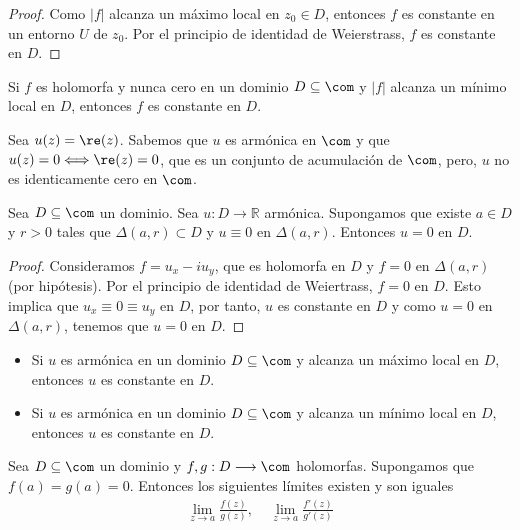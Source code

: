 \begin{proof}
Como $|f|$ alcanza un máximo local en $z_0 \in D$, entonces $f$ es constante en un entorno $U$ de $z_0$. Por el principio de identidad de Weierstrass, $f$ es constante en $D$.
\end{proof}

\begin{teo}
Si $f$ es holomorfa y nunca cero en un dominio $D \subseteq \com$ y $|f|$ alcanza un mínimo local en $D$, entonces $f$ es constante en $D$.
\end{teo}

\begin{ejemplo}
Sea $u(z) = \re(z)$. Sabemos que $u$ es armónica en $\com$ y que $u(z) = 0 \Longleftrightarrow \re(z) = 0$, que es un conjunto de acumulación de $\com$, pero, $u$ no es identicamente cero en $\com$.
\end{ejemplo}

\begin{teo}
Sea $D \subseteq \com$ un dominio. Sea $u: D \longrightarrow \mathbb{R}$ armónica. Supongamos que existe $a \in D$ y $r > 0$ tales que $\Delta(a,r) \subset D$ y $u \equiv 0$ en $\Delta(a,r)$. Entonces $u = 0$ en $D$.
\end{teo}

\begin{proof}
Consideramos $f = u_x - iu_y$, que es holomorfa en $D$ y $f = 0$ en $\Delta(a,r)$ (por hipótesis). Por el principio de identidad de Weiertrass, $f = 0$ en $D$. Esto implica que $u_x \equiv 0 \equiv u_y$ en $D$, por tanto, $u$ es constante en $D$ y como $u = 0$ en $\Delta(a,r)$, tenemos que $u = 0$ en $D$.
\end{proof}

\begin{teo}
\begin{itemize}
    \item Si $u$ es armónica en un dominio $D \subseteq \com$ y alcanza un máximo local en $D$, entonces $u$ es constante en $D$.
    \item Si $u$ es armónica en un dominio $D \subseteq \com$ y alcanza un mínimo local en $D$, entonces $u$ es constante en $D$.
\end{itemize}
\end{teo}

\begin{teo}
Sea $D \subseteq \com$ un dominio y $f,g: D \longrightarrow \com$ holomorfas. Supongamos que $f(a) = g(a) = 0$. Entonces los siguientes límites existen y son iguales
\begin{align*}
    \lim_{z \to a}{\frac{f(z)}{g(z)}}, \ \ \ \ \ \lim_{z \to a}{\frac{f'(z)}{g'(z)}}
\end{align*}
\end{teo}

